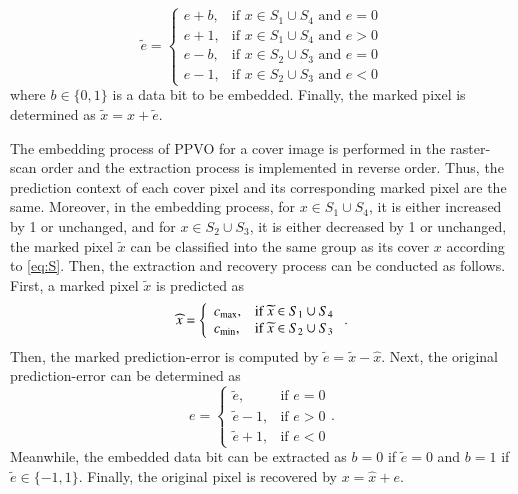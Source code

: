 \documentclass[review,3p,10pt,sort&compress]{elsarticle}
\begin{document}
\begin{equation}\label{eq:PPVOMPE}
    \widetilde{e} = \left\{\begin{array}{ll}
    e + b,  & \text{if } x \in S_1 \cup S_4 \text{ and } e = 0 \\
    e + 1,  & \text{if } x \in S_1 \cup S_4 \text{ and } e > 0 \\
    e - b,  & \text{if } x \in S_2 \cup S_3 \text{ and } e = 0 \\
    e - 1,  & \text{if } x \in S_2 \cup S_3 \text{ and } e < 0
\end{array}\right.
\end{equation}
where $b \in \{0,1\}$ is a data bit to be embedded. Finally, the marked pixel is determined as $\widetilde{x} = \widehat{x} + \widetilde{e}$.

The embedding process of PPVO for a cover image is performed in the raster-scan order and the extraction process is implemented in reverse order. Thus, the prediction context of each cover pixel and its corresponding marked pixel are the same. Moreover, in the embedding process, for $x \in S_1 \cup S_4$, it is either increased by 1 or unchanged, and for $x \in S_2 \cup S_3$, it is either decreased by 1 or unchanged, the marked pixel $\widetilde{x}$ can be classified into the same group as its cover $x$ according to \eqref{eq:S}. Then, the extraction and recovery process can be conducted as follows. First, a marked pixel $\widetilde{x}$ is predicted as
\begin{equation}\label{eq:xhat2}
    \widehat{x} = \left\{\begin{array}{ll}
    c_{\rm max},  & \text{if } \widetilde{x} \in S_1 \cup S_4 \\
    c_{\rm min},  & \text{if } \widetilde{x} \in S_2 \cup S_3
\end{array}\right.
.
\end{equation}
Then, the marked prediction-error is computed by $\widetilde{e} = \widetilde{x} - \widehat{x}$. Next, the original prediction-error can be determined as
\begin{equation}\label{eq:dPPVOMPE}
e = \left\{\begin{array}{ll}
\widetilde{e},      & \text{if } e = 0      \\
\widetilde{e} - 1,  & \text{if } e > 0   \\
\widetilde{e} + 1,  & \text{if } e < 0
\end{array}\right..
\end{equation}
Meanwhile, the embedded data bit can be extracted as $b = 0$ if $\widetilde{e} = 0$ and $b = 1$ if $\widetilde{e} \in \{-1, 1\}$. Finally, the original pixel is recovered by $x = \widehat{x} + e$. 
\end{document}
